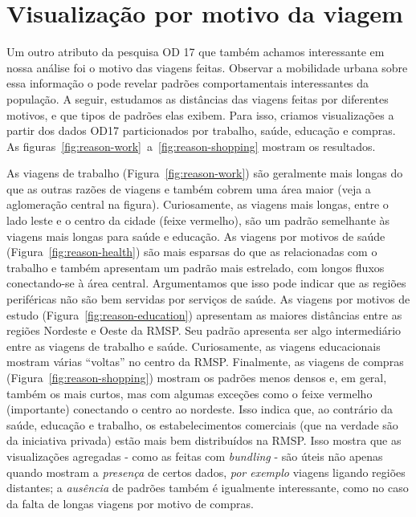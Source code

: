 \section{Visualização por motivo da viagem}
\label{sec:dist_reasons}
Um outro atributo da pesquisa OD 17 que também achamos interessante em nossa
análise foi o motivo das viagens feitas. Observar a mobilidade urbana sobre essa
informação o pode revelar padrões comportamentais interessantes da população. A
seguir, estudamos as distâncias das viagens feitas por diferentes motivos, e que
tipos de padrões elas exibem. Para isso, criamos visualizações a partir dos
dados OD17 particionados por trabalho, saúde, educação e compras. As
figuras~\ref{fig:reason-work}~a~\ref{fig:reason-shopping} mostram os resultados.

As viagens de trabalho (Figura~\ref{fig:reason-work}) são geralmente mais longas
do que as outras razões de viagens e também cobrem uma área maior (veja a
aglomeração central na figura). Curiosamente, as viagens mais longas, entre o
lado leste e o centro da cidade (feixe vermelho), são um padrão semelhante às
viagens mais longas para saúde e educação. As viagens por motivos de saúde
(Figura~\ref{fig:reason-health}) são mais esparsas do que as relacionadas com o
trabalho e também apresentam um padrão mais estrelado, com longos fluxos
conectando-se à área central. Argumentamos que isso pode indicar que as regiões
periféricas não são bem servidas por serviços de saúde. As viagens por motivos
de estudo (Figura~\ref{fig:reason-education}) apresentam as maiores distâncias
entre as regiões Nordeste e Oeste da RMSP. Seu padrão apresenta ser algo
intermediário entre as viagens de trabalho e saúde. Curiosamente, as viagens
educacionais mostram várias ``voltas'' no centro da RMSP. Finalmente, as viagens
de compras (Figura~\ref{fig:reason-shopping}) mostram os padrões menos densos e,
em geral, também os mais curtos, mas com algumas exceções como o feixe vermelho
(importante) conectando o centro ao nordeste. Isso indica que, ao contrário da
saúde, educação e trabalho, os estabelecimentos comerciais (que na verdade são
da iniciativa privada) estão mais bem distribuídos na RMSP. Isso mostra que as
visualizações agregadas - como as feitas com \emph{bundling} - são úteis não
apenas quando mostram a \emph{presença} de certos dados, \emph{por exemplo}
viagens ligando regiões distantes; a \emph{ausência} de padrões também é
igualmente interessante, como no caso da falta de longas viagens por motivo de
compras.


